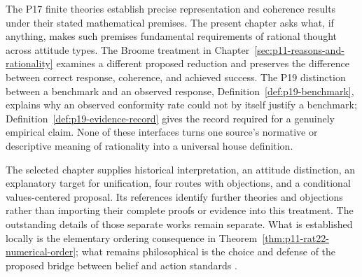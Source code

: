 The P17 finite theories establish precise representation and coherence
results under their stated mathematical premises. The present chapter
asks what, if anything, makes such premises fundamental requirements of
rational thought across attitude types. The Broome treatment in
Chapter~\ref{sec:p11-reasons-and-rationality} examines a different proposed
reduction and preserves the difference between correct response, coherence,
and achieved success. The P19 distinction between a benchmark and an
observed response, Definition~\ref{def:p19-benchmark}, explains why an
observed conformity rate could not by itself justify a benchmark;
Definition~\ref{def:p19-evidence-record} gives the record required for a
genuinely empirical claim. None of these interfaces turns one source's
normative or descriptive meaning of rationality into a universal house
definition.

The selected chapter supplies historical interpretation, an attitude
distinction, an explanatory target for unification, four routes with
objections, and a conditional values-centered proposal. Its references
identify further theories and objections rather than importing their
complete proofs or evidence into this treatment. The outstanding details
of those separate works remain separate. What is established locally is
the elementary ordering consequence in
Theorem~\ref{thm:p11-rat22-numerical-order}; what remains philosophical is
the choice and defense of the proposed bridge between belief and action
standards
\parencite[pp.~144--145]{RalphWedgwood2021}.

